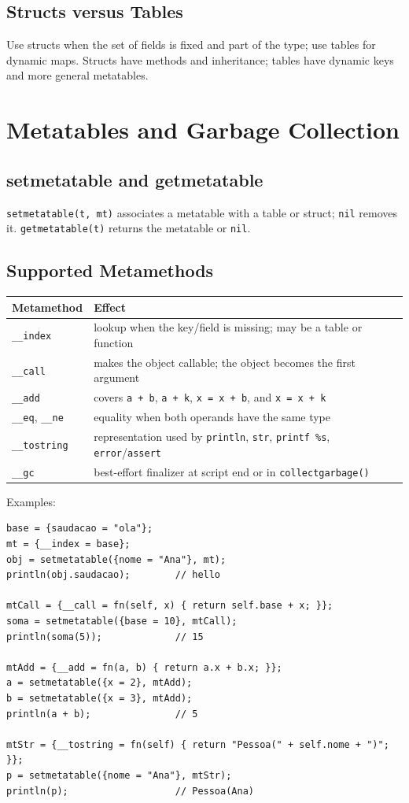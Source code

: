 \documentclass[11pt,a4paper,oneside]{report}
\newcommand{\code}[1]{\texttt{#1}}
\begin{document}
\section{Structs versus Tables}
Use structs when the set of fields is fixed and part of the type; use
tables for dynamic maps. Structs have methods and inheritance; tables have
dynamic keys and more general metatables.

\chapter{Metatables and Garbage Collection}
\label{cap:metatables}

\section{setmetatable and getmetatable}
\code{setmetatable(t, mt)} associates a metatable with a table or struct;
\code{nil} removes it. \code{getmetatable(t)} returns the metatable or
\code{nil}.

\section{Supported Metamethods}
\begin{center}
\begin{tabular}{L{3.2cm}L{10.5cm}}
\toprule
Metamethod & Effect \\
\midrule
\code{\_\_index} & lookup when the key/field is missing; may be a table or function \\
\code{\_\_call} & makes the object callable; the object becomes the first argument \\
\code{\_\_add} & covers \code{a + b}, \code{a + k}, \code{x = x + b}, and \code{x = x + k} \\
\code{\_\_eq}, \code{\_\_ne} & equality when both operands have the same type \\
\code{\_\_tostring} & representation used by \code{println}, \code{str}, \code{printf \%s}, \code{error}/\code{assert} \\
\code{\_\_gc} & best-effort finalizer at script end or in \code{collectgarbage()} \\
\bottomrule
\end{tabular}
\end{center}

Examples:
\begin{lstlisting}
base = {saudacao = "ola"};
mt = {__index = base};
obj = setmetatable({nome = "Ana"}, mt);
println(obj.saudacao);        // hello

mtCall = {__call = fn(self, x) { return self.base + x; }};
soma = setmetatable({base = 10}, mtCall);
println(soma(5));             // 15

mtAdd = {__add = fn(a, b) { return a.x + b.x; }};
a = setmetatable({x = 2}, mtAdd);
b = setmetatable({x = 3}, mtAdd);
println(a + b);               // 5

mtStr = {__tostring = fn(self) { return "Pessoa(" + self.nome + ")"; }};
p = setmetatable({nome = "Ana"}, mtStr);
println(p);                   // Pessoa(Ana)
\end{lstlisting}
\end{document}

